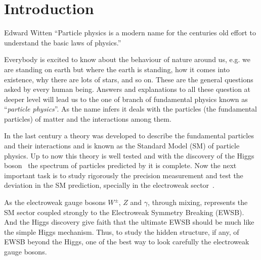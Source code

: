\chapter{Introduction}
\begin{chapquote}
{Edward Witten}
``Particle physics is a modern name for the centuries old effort to understand the basic laws of physics.''
\end{chapquote}
Everybody is excited to know about the behaviour of nature around us, e.g. we are standing on earth but where the earth is standing, how it comes into existence, why there are lots of stars, and so on.
These are the general questions asked by every human being. Answers and explanations to all these question at deeper level will lead us to the one of branch of fundamental physics known as ``\textit{particle physics}''.
As the name infers it deals with the particles (the fundamental particles) of matter and the interactions among them.

In the last century a theory was developed to describe the fundamental particles and their interactions and is known as the Standard Model (SM) of particle physics.
Up to now this theory is well tested and with the discovery of the Higgs boson~\cite{Chatrchyan:2012xdj,Aad:2012tfa} the spectrum of particles predicted by it is complete.
Now the next important task is to study rigorously the precision measurement and test the deviation in the SM prediction, specially in the electroweak sector~\cite{Baak2013}.


As the electroweak gauge bosons $W^{\pm}$, $Z$ and $\gamma$, through mixing, represents the SM sector coupled strongly to the Electroweak Symmetry Breaking (EWSB).
And the Higgs discovery give faith that the ultimate EWSB should be much like the simple Higgs mechanism.
Thus, to study the hidden structure, if any, of EWSB beyond the Higgs, one of the best way to look carefully the electroweak gauge bosons.


